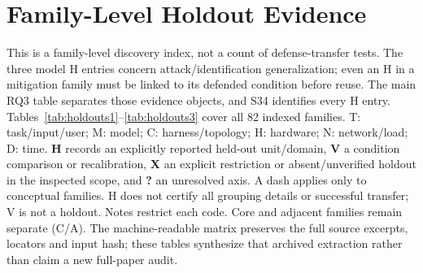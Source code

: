 \section{Family-Level Holdout Evidence}\label{app:holdouts}
This is a family-level discovery index, not a count of defense-transfer tests. The three model H entries concern attack/identification generalization; even an H in a mitigation family must be linked to its defended condition before reuse. The main RQ3 table separates those evidence objects, and S34 identifies every H entry.
Tables~\ref{tab:holdouts1}--\ref{tab:holdouts3} cover all 82 indexed families. T: task/input/user; M: model; C: harness/topology; H: hardware; N: network/load; D: time. \textbf{H} records an explicitly reported held-out unit/domain, \textbf{V} a condition comparison or recalibration, \textbf{X} an explicit restriction or absent/unverified holdout in the inspected scope, and \textbf{?} an unresolved axis. A dash applies only to conceptual families. H does not certify all grouping details or successful transfer; V is not a holdout. Notes restrict each code. Core and adjacent families remain separate (C/A). The machine-readable matrix preserves the full source excerpts, locators and input hash; these tables synthesize that archived extraction rather than claim a new full-paper audit.
